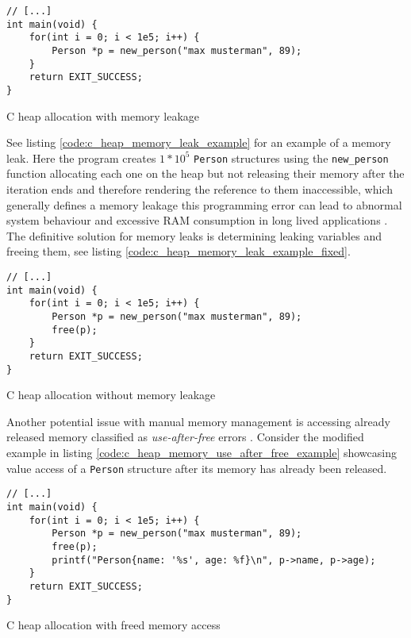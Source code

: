 \begin{listing}[H] 
    \begin{verbatim} 
// [...]
int main(void) {
    for(int i = 0; i < 1e5; i++) {
        Person *p = new_person("max musterman", 89);
    }
    return EXIT_SUCCESS;
}
    \end{verbatim}
    \caption{C heap allocation with memory leakage}
    \label{code:c_heap_memory_leak_example}
\end{listing}

See listing \autoref{code:c_heap_memory_leak_example} for an example of a
memory leak. Here the program creates $1*10^5$ \texttt{Person} structures
using the \texttt{new\_person} function allocating each one on the heap but
not releasing their memory after the iteration ends and therefore rendering
the reference to them inaccessible, which generally defines a memory leakage
this programming error can lead to abnormal system behaviour and excessive RAM
consumption in long lived applications
\cite[Description]{owasp-memoryleak_unknown_unknown}. The definitive solution
for memory leaks is determining leaking variables and freeing them, see
listing \autoref{code:c_heap_memory_leak_example_fixed}.

\begin{listing}[H] 
    \begin{verbatim} 
// [...]
int main(void) {
    for(int i = 0; i < 1e5; i++) {
        Person *p = new_person("max musterman", 89);
        free(p);
    }
    return EXIT_SUCCESS;
}
    \end{verbatim}
    \caption{C heap allocation without memory leakage}
    \label{code:c_heap_memory_leak_example_fixed}
\end{listing}

Another potential issue with manual memory management is accessing already
released memory classified as \textit{use-after-free} errors
\cite{owasp-use-after-free_unkown_unknown}. Consider the modified example in
listing \autoref{code:c_heap_memory_use_after_free_example} showcasing value
access of a \texttt{Person} structure after its memory has already been
released.

\begin{listing}[H] 
    \begin{verbatim} 
// [...]
int main(void) {
    for(int i = 0; i < 1e5; i++) {
        Person *p = new_person("max musterman", 89);
        free(p);
        printf("Person{name: '%s', age: %f}\n", p->name, p->age);
    }
    return EXIT_SUCCESS;
}
    \end{verbatim}
    \caption{C heap allocation with freed memory access}
    \label{code:c_heap_memory_use_after_free_example}
\end{listing}

